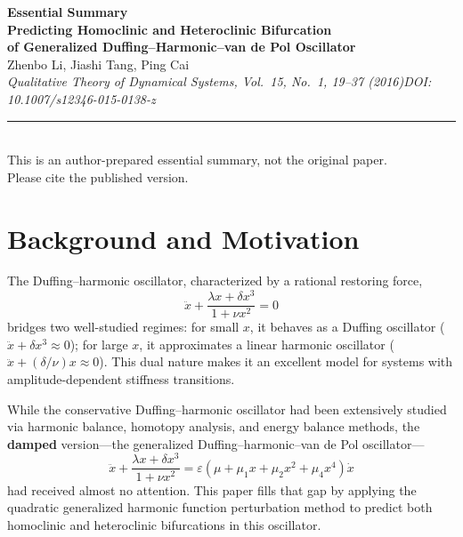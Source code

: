 \documentclass[11pt,a4paper]{article}
\begin{document}
\begin{center}
{\LARGE\bfseries\color{primary}Essential Summary}\\[12pt]
{\large\bfseries Predicting Homoclinic and Heteroclinic Bifurcation\\of Generalized Duffing--Harmonic--van de Pol Oscillator}\\[8pt]
{\normalsize Zhenbo Li, Jiashi Tang, Ping Cai}\\[4pt]
{\small\itshape Qualitative Theory of Dynamical Systems, Vol.\ 15, No.\ 1, 19--37 (2016)\quad DOI: 10.1007/s12346-015-0138-z}\\[6pt]
{\small\rule{0.7\textwidth}{0.5pt}}\\[4pt]
{\small\color{accent}This is an author-prepared essential summary, not the original paper.\\Please cite the published version.}
\end{center}

\vspace{0.5em}

\section{Background and Motivation}

The Duffing--harmonic oscillator, characterized by a rational restoring force,
\begin{equation}
\ddot{x} + \frac{\lambda x + \delta x^3}{1 + \nu x^2} = 0
\label{eq:undamped}
\end{equation}
bridges two well-studied regimes: for small $x$, it behaves as a Duffing oscillator ($\ddot{x} + \delta x^3 \approx 0$); for large $x$, it approximates a linear harmonic oscillator ($\ddot{x} + (\delta/\nu) x \approx 0$). This dual nature makes it an excellent model for systems with amplitude-dependent stiffness transitions.

While the conservative Duffing--harmonic oscillator had been extensively studied via harmonic balance, homotopy analysis, and energy balance methods, the \textbf{damped} version---the generalized Duffing--harmonic--van de Pol oscillator---
\begin{equation}
\ddot{x} + \frac{\lambda x + \delta x^3}{1 + \nu x^2} = \varepsilon(\mu + \mu_1 x + \mu_2 x^2 + \mu_4 x^4)\dot{x}
\label{eq:damped}
\end{equation}
had received almost no attention. This paper fills that gap by applying the quadratic generalized harmonic function perturbation method to predict both homoclinic and heteroclinic bifurcations in this oscillator.
\end{document}
